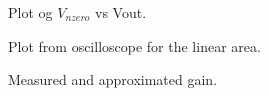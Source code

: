 \documentclass[a4paper,english,11pt]{article}
\begin{document}
\begin{figure}[!htbp]
 \centering
  \caption{Plot og $V_{nzero}$ vs Vout.}
  \label{fig:vnzero:vout}	
\end{figure}

\begin{figure}[!htbp]
 \centering
  \caption{Plot from oscilloscope for the linear area.}
  \label{fig:scope:plot:lin}	
\end{figure}
\begin{figure}[!htbp]
 \centering
  \caption{Measured and approximated gain.}
  \label{fig:mes:approx:gain}	
\end{figure}
\end{document}
